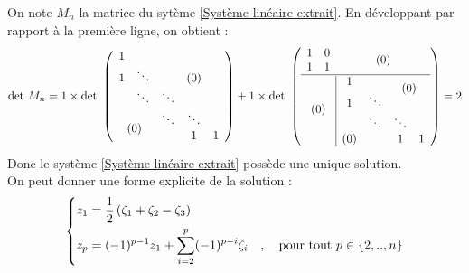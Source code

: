 \documentclass[twoside,11pt,openany,a4paper]{rapport}
\begin{document}
On note $M_n$ la matrice du sytème \ref{Système linéaire extrait}. En développant par rapport à la première ligne, on obtient :
\begin{gather*}
  \mbox{det }M_n =
  1 \times \mbox{det } \left(
  \begin{array}{ccccc}
    1 &                                         &        &        &   \\
    1 & \ddots                                  &        & (0)    &   \\
      & \ddots                                  & \ddots &        &   \\
    \multicolumn{2}{c}{\multirow{2}{*}{ (0) }}  & \ddots & \ddots &   \\
    \multicolumn{2}{c}{}                        &        & 1      & 1
  \end{array} \right)
  + 1 \times \mbox{det } \left(
  \begin{array}{cc|cccc}
    1 & 0                                       & \multicolumn{4}{c}{\multirow{2}{*}{ (0) }} \\
    1 & 1                                       & \multicolumn{4}{c}{}                       \\
    \hline
    \multicolumn{2}{c|}{\multirow{5}{*}{ (0) }} & 1   &        & \multicolumn{2}{c}{\multirow{2}{*}{ (0) }} \\
    \multicolumn{2}{c|}{}                       & 1   & \ddots & \multicolumn{2}{c}{}                       \\
    \multicolumn{2}{c|}{}                       &     & \ddots & \ddots &                                   \\
    \multicolumn{2}{c|}{}                       & (0) &        & 1      & 1
  \end{array} \right)
  = 2
\end{gather*}
Donc le système \ref{Système linéaire extrait} possède une unique solution.
\\

On peut donner une forme explicite de la solution :
\begin{equation}
  \left\{
  \begin{aligned}\notag
    z_1 &= \frac{1}{2}\left(\zeta_1 + \zeta_2 - \zeta_3\right) \\
    z_p &= (-1)^{p-1} z_1 + \sum_{i=2}^p (-1)^{p-i}\zeta_i \quad , \quad \mbox{pour tout } p \in \{2,..,n\}
  \end{aligned}
  \right.
\end{equation}
\end{document}
